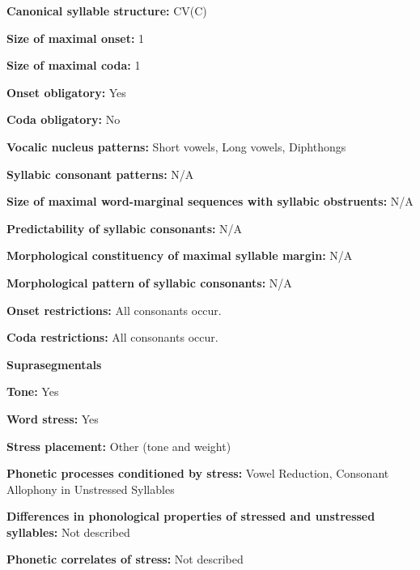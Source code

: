 \textbf{Canonical syllable structure:} CV(C) \citep[11]{Bright1957}



\textbf{Size of maximal onset:} 1



\textbf{Size of maximal coda:} 1



\textbf{Onset obligatory:} Yes



\textbf{Coda obligatory:} No



\textbf{Vocalic nucleus patterns:} Short vowels, Long vowels, Diphthongs



\textbf{Syllabic consonant patterns:} N/A



\textbf{Size of maximal word{}-marginal sequences with syllabic obstruents:} N/A



\textbf{Predictability of syllabic consonants:} N/A



\textbf{Morphological constituency of maximal syllable margin:} N/A



\textbf{Morphological pattern of syllabic consonants:} N/A



\textbf{Onset restrictions:} All consonants occur.



\textbf{Coda restrictions:} All consonants occur.



\textbf{Suprasegmentals}



\textbf{Tone:} Yes



\textbf{Word stress:} Yes



\textbf{Stress placement:} Other (tone and weight)



\textbf{Phonetic processes conditioned by stress:} Vowel Reduction, Consonant Allophony in Unstressed Syllables



\textbf{Differences in phonological properties of stressed and unstressed syllables:} Not described



\textbf{Phonetic correlates of stress:} Not described



